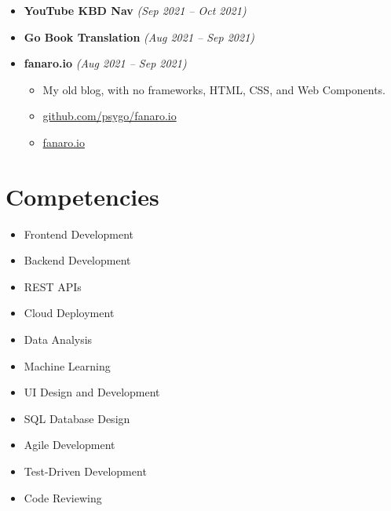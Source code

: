 \documentclass[14pt]{extarticle}
\renewcommand{\_}{\leavevmode\kern.06em\vbox{\hrule width.425em}}
\begin{document}
\begin{itemize}
  \item \textbf{YouTube KBD Nav} \textit{(Sep 2021 -- Oct 2021)}
  
  \item \textbf{Go Book Translation} \textit{(Aug 2021 -- Sep 2021)}
    
  \item \textbf{fanaro.io} \textit{(Aug 2021 -- Sep 2021)}
    \begin{itemize}
      \item My old blog, with no frameworks, HTML, CSS, and Web Components.
      \item \href{https://github.com/psygo/fanaro.io}{github.com/psygo/fanaro.io}
      \item \href{https://psygo.github.io/fanaro.io/}{fanaro.io}
    \end{itemize}
\end{itemize}

\section{Competencies}

\begin{itemize}
  \item Frontend Development
  \item Backend Development
  \item REST APIs
  \item Cloud Deployment
  \item Data Analysis
  \item Machine Learning
  \item UI Design and Development
  \item SQL Database Design
  \item Agile Development
  \item Test-Driven Development
  \item Code Reviewing
\end{itemize}
\end{document}
